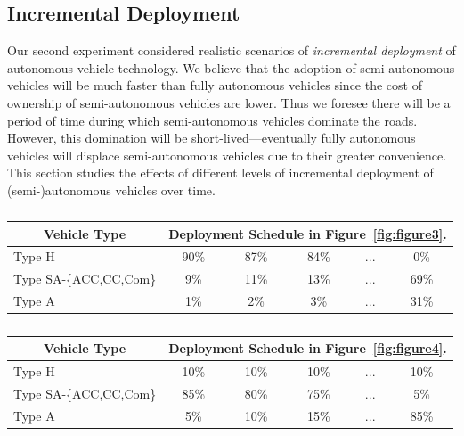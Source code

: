 


\subsection{Incremental Deployment}

Our second experiment considered realistic scenarios of
\emph{incremental deployment} of autonomous vehicle technology.  We
believe that the adoption of semi-autonomous vehicles will be much
faster than fully autonomous vehicles since the cost of ownership of
semi-autonomous vehicles are lower.  Thus we foresee there will be
a period of time during which semi-autonomous vehicles dominate the
roads.  However, this domination will be short-lived---eventually
fully autonomous vehicles will displace semi-autonomous vehicles due
to their greater convenience.  This section studies the effects of
different levels of incremental deployment of (semi-)autonomous
vehicles over time.

\begin{table}[t]
\caption{}
\label{table:3}
\centering
\small
\vspace{-.1in}
\begin{tabular}{|l|ccccc|}
\hline
\multicolumn{1}{|c|}{Vehicle Type} & \multicolumn{5}{c|}{Deployment Schedule in Figure~\ref{fig:figure3}.} \\
\hline
Type H & 90\% & 87\% & 84\% & ... & 0\% \\
Type SA-\{ACC,CC,Com\} & 9\% & 11\% & 13\% & ... & 69\% \\
Type A & 1\% & 2\% & 3\% & ... & 31\% \\
\hline
\end{tabular}

\mbox{}

\caption{}
\label{table:4}
\centering
\small
\vspace{-.1in}
\begin{tabular}{|l|ccccc|}
\hline
\multicolumn{1}{|c|}{Vehicle Type} & \multicolumn{5}{c|}{Deployment Schedule in Figure~\ref{fig:figure4}.} \\
\hline
Type H & 10\% & 10\% & 10\% & ... & 10\% \\
Type SA-\{ACC,CC,Com\} & 85\% & 80\% & 75\% & ... & 5\% \\
Type A & 5\% & 10\% & 15\% & ... & 85\% \\
\hline
\end{tabular}

\vspace{-.3in}
\end{table}


